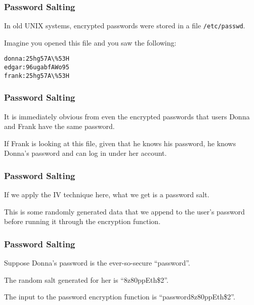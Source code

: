 \begin{frame}[fragile]
\frametitle{Password Salting}
\begin{changemargin}{1cm}

In old UNIX systems, encrypted passwords were stored in a file \texttt{/etc/passwd}. 

Imagine you opened this file and you saw the following:

\begin{verbatim}
donna:25hg57A\%53H
edgar:96ugabfAWo95
frank:25hg57A\%53H
\end{verbatim}

\end{changemargin}
\end{frame}

\begin{frame}
\frametitle{Password Salting}
\begin{changemargin}{1cm}

It is immediately obvious from even the encrypted passwords that users Donna and Frank have the same password. 

If Frank is looking at this file, given that he knows his password, he knows Donna's password and can log in under her account.

\end{changemargin}
\end{frame}

\begin{frame}
\frametitle{Password Salting}
\begin{changemargin}{1cm}

If we apply the IV technique here, what we get is a password \alert{salt}. 

This is some randomly generated data that we append to the user's password before running it through the encryption function. 
\end{changemargin}
\end{frame}

\begin{frame}
\frametitle{Password Salting}
\begin{changemargin}{1cm}

Suppose Donna's password is the ever-so-secure ``password''.

The random salt generated for her is ``8z80ppEth\$2''. 

The input to the password encryption function is ``password8z80ppEth\$2''. 

\end{changemargin}
\end{frame}

